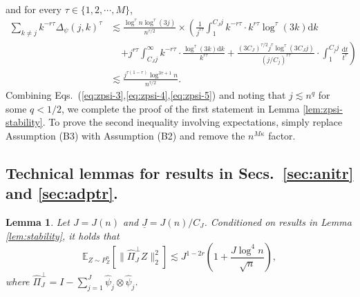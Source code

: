 \documentclass[11pt,a4paper]{article}
\renewcommand{\hat}{\widehat}
\theoremstyle{definition}
\theoremstyle{plain}
\newtheorem{lemma}{Lemma}[section]
\theoremstyle{remark}
\newcommand{\ud}{\mathrm d}
\newcommand{\und}{\underline}
\begin{document}
and for every $\tau\in\{1,2,\cdots,M\}$, 
\begin{align}
\sum_{k\neq j}k^{-r\tau}\Delta_\psi(j,k)^\tau &\lesssim  \frac{\log^\tau n\log^\tau(3j)}{n^{\tau/2}}\times \left( \frac{1}{j^{r\tau}}\int_1^{C_J j}k^{-r\tau}\cdot k^{r\tau}\log^\tau(3k)\ud k \right.\nonumber\\
&\;\;\;\;\left.+ j^{r\tau}\int_{C_J j}^{\infty}k^{-r\tau}\cdot\frac{\log^\tau(3k)\ud k}{k^{r\tau}} + \frac{(3C_J)^{\tau/2} j^\tau\log^\tau(3C_Jj)}{(j/C_j)^{r\tau}}\cdot \int_1^{C_j j}\frac{\ud t}{t^\tau}\right)\nonumber\\
&\lesssim \frac{j^{\tau(1-r)}\log^{3\tau+1}n}{n^{\tau/2}}.\label{eq:zpsi-5}
\end{align}
Combining Eqs.~(\ref{eq:zpsi-3},\ref{eq:zpsi-4},\ref{eq:zpsi-5}) and noting that $j\lesssim n^q$ for some $q<1/2$, we complete the proof of the first statement in Lemma \ref{lem:zpsi-stability}.
To prove the second inequality involving expectations, simply replace Assumption (B3) with Assumption (B2) and remove the $n^{M\kappa}$ factor.


\subsection{Technical lemmas for results in Secs.~\ref{sec:anitr} and \ref{sec:adptr}.}


\begin{lemma}
Let $J=J(n)$ and $\und J=J(n)/C_J$.
Conditioned on results in Lemma \ref{lem:stability}, it holds that
$$
\mathbb E_{Z\sim P_Z^n}[\|\hat\Pi_J^\perp Z\|_2^2] \lesssim J^{1-2r}\left(1+\frac{J\log^4 n}{\sqrt{n}}\right),
$$
where $\hat\Pi_{J}^\perp = I-\sum_{j=1}^{J}\hat\psi_j\otimes\hat\psi_j$.
\label{lem:truncation}
\end{lemma}
\end{document}
